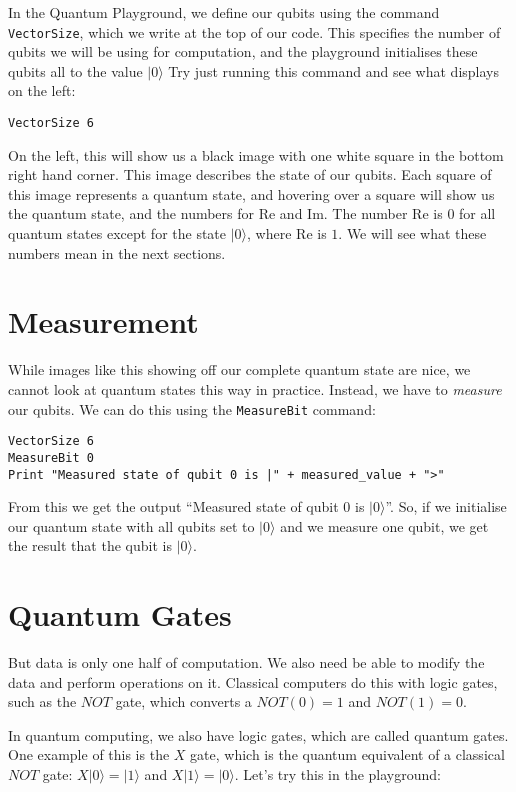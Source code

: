 \documentclass[twocolumn]{article}
\begin{document}
In the Quantum Playground, we define our qubits using the command \texttt{VectorSize}, which we write at the top of our code. This specifies the number of qubits we will be using for computation, and the playground initialises these qubits all to the value $|0\rangle$ Try just running this command and see what displays on the left:

\begin{lstlisting}
VectorSize 6
\end{lstlisting}

On the left, this will show us a black image with one white square in the bottom right hand corner. This image describes the state of our qubits. Each square of this image represents a quantum state, and hovering over a square will show us the quantum state, and the numbers for Re and Im. The number Re is $0$ for all quantum states except for the state $|0\rangle$, where Re is $1$. We will see what these numbers mean in the next sections.

\section{Measurement}

While images like this showing off our complete quantum state are nice, we cannot look at quantum states this way in practice. Instead, we have to {\em measure} our qubits. We can do this using the \texttt{MeasureBit} command:

\begin{lstlisting}
VectorSize 6
MeasureBit 0
Print "Measured state of qubit 0 is |" + measured_value + ">"
\end{lstlisting}

From this we get the output ``Measured state of qubit $0$ is $|0\rangle$''. So, if we initialise our quantum state with all qubits set to $|0\rangle$ and we measure one qubit, we get the result that the qubit is  $|0\rangle$.

\section{Quantum Gates}

But data is only one half of computation. We also need be able to modify the data and perform operations on it. Classical computers do this with logic gates, such as the $NOT$ gate, which converts a $NOT(0) = 1$ and $NOT(1) = 0$.

In quantum computing, we also have logic gates, which are called quantum gates. One example of this is the $X$ gate, which is the quantum equivalent of a classical $NOT$ gate: $X|0\rangle = |1\rangle$ and $X|1\rangle = |0\rangle$. Let's try this in the playground:
\end{document}
